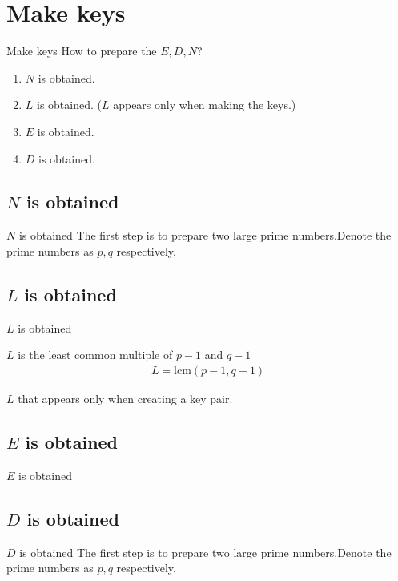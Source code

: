 \documentclass[dvipdfmx]{beamer}
\begin{document}
\section{Make keys}
\begin{frame}{Make keys}
    How to prepare the \(E,D,N\)?
    \begin{enumerate}
        \item \(N\) is obtained.
        \item \(L\) is obtained. (\(L\) appears only when making the keys.)
        \item \(E\) is obtained.
        \item \(D\) is obtained.
    \end{enumerate}
\end{frame}
\subsection{\(N\) is obtained}
\begin{frame}{\(N\) is obtained}
    The first step is to prepare two large prime numbers.Denote the prime numbers as \(p,q\) respectively.
\end{frame}

\subsection{\(L\) is obtained}
\begin{frame}{\(L\) is obtained}
    \begin{alertblock}{\(L\) is the least common multiple of \(p-1\) and \(q-1\)}
        \begin{align}
            L=\mathrm{lcm}(p-1,q-1)
        \end{align}
    \end{alertblock}
    \(L\) that appears only when creating a key pair.
\end{frame}

\subsection{\(E\) is obtained}
\begin{frame}{\(E\) is obtained}
\end{frame}

\subsection{\(D\) is obtained}
\begin{frame}{\(D\) is obtained}
    The first step is to prepare two large prime numbers.Denote the prime numbers as \(p,q\) respectively.
\end{frame}
\end{document}
